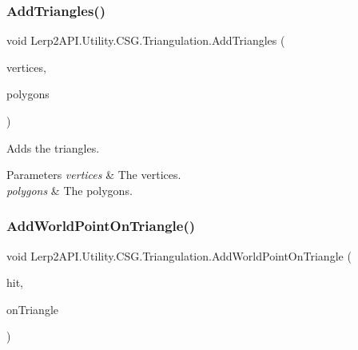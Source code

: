 \subsubsection{\texorpdfstring{Add\+Triangles()}{AddTriangles()}}
{\footnotesize\ttfamily void Lerp2\+A\+P\+I.\+Utility.\+C\+S\+G.\+Triangulation.\+Add\+Triangles (\begin{DoxyParamCaption}\item[{\hyperlink{class_lerp2_a_p_i_1_1_utility_1_1_c_s_g_1_1_triangulation_1_1_vertex}{Vertex} \mbox{[}$\,$\mbox{]}}]{vertices,  }\item[{\hyperlink{class_lerp2_a_p_i_1_1_utility_1_1_c_s_g_1_1_triangulation_1_1_polygon}{Polygon} \mbox{[}$\,$\mbox{]}}]{polygons }\end{DoxyParamCaption})\hspace{0.3cm}{\ttfamily [inline]}}



Adds the triangles. 


\begin{DoxyParams}{Parameters}
{\em vertices} & The vertices.\\
\hline
{\em polygons} & The polygons.\\
\hline
\end{DoxyParams}
\mbox{\label{class_lerp2_a_p_i_1_1_utility_1_1_c_s_g_1_1_triangulation_a73f6a79bc7d40d0e4323bd2303724e7d}} 
\subsubsection{\texorpdfstring{Add\+World\+Point\+On\+Triangle()}{AddWorldPointOnTriangle()}\hspace{0.1cm}{\footnotesize\ttfamily [1/3]}}
{\footnotesize\ttfamily void Lerp2\+A\+P\+I.\+Utility.\+C\+S\+G.\+Triangulation.\+Add\+World\+Point\+On\+Triangle (\begin{DoxyParamCaption}\item[{Raycast\+Hit}]{hit,  }\item[{int}]{on\+Triangle }\end{DoxyParamCaption})\hspace{0.3cm}{\ttfamily [inline]}}



